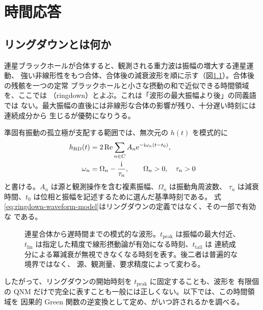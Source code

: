 \chapter{時間応答}
\label{chap:time-response}

\section{リングダウンとは何か}

連星ブラックホールが合体すると、観測される重力波は振幅の増大する連星運動、
強い非線形性をもつ合体、合体後の減衰波形を順に示す（図\ref{fig:ringdown-regimes}）。合体後の残骸を一つの定常
ブラックホールと小さな摂動の和で近似できる時間領域を、ここでは
（ringdown）とよぶ。これは「波形の最大振幅より後」の同義語では
ない。最大振幅の直後には非線形な合体の影響が残り、十分遅い時刻には連続成分から
生じるが優勢になりうる。

準固有振動の孤立極が支配する範囲では、無次元の $h(t)$ を模式的に
\begin{align}
h_{\mathrm{RD}}(t)
&=
2\operatorname{Re}\sum_{n\in C}
A_n\mathrm{e}^{-\mathrm{i}\omega_n(t-t_0)},
\label{eq:ringdown-waveform-model}
\\
\omega_n
&=
\Omega_n-\frac{\mathrm{i}}{\tau_n},
\qquad
\Omega_n>0,
\quad
\tau_n>0
\label{eq:ringdown-frequency-decay}
\end{align}
と書ける。$A_n$ は源と観測操作を含む複素振幅、$\Omega_n$ は振動角周波数、
$\tau_n$ は減衰時間、$t_0$ は位相と振幅を記述するために選んだ基準時刻である。
式\eqref{eq:ringdown-waveform-model}はリングダウンの定義ではなく、その一部で有効な
である。

\begin{figure}[tbp]
\centering

\caption{連星合体から遅時間までの模式的な波形。$t_{\mathrm{peak}}$ は振幅の最大付近、
$t_{\mathrm{lin}}$ は指定した精度で線形摂動論が有効になる時刻、$t_{\mathrm{tail}}$ は
連続成分による冪減衰が無視できなくなる時刻を表す。後二者は普遍的な境界ではなく、
源、観測量、要求精度によって変わる。}
\label{fig:ringdown-regimes}
\end{figure}

したがって、リングダウンの開始時刻を $t_{\mathrm{peak}}$ に固定することも、波形を
有限個の QNM だけで完全に表すことも一般には正しくない。以下では、この時間領域を
因果的 Green 関数の逆変換として定め、がいつ許されるかを調べる。

